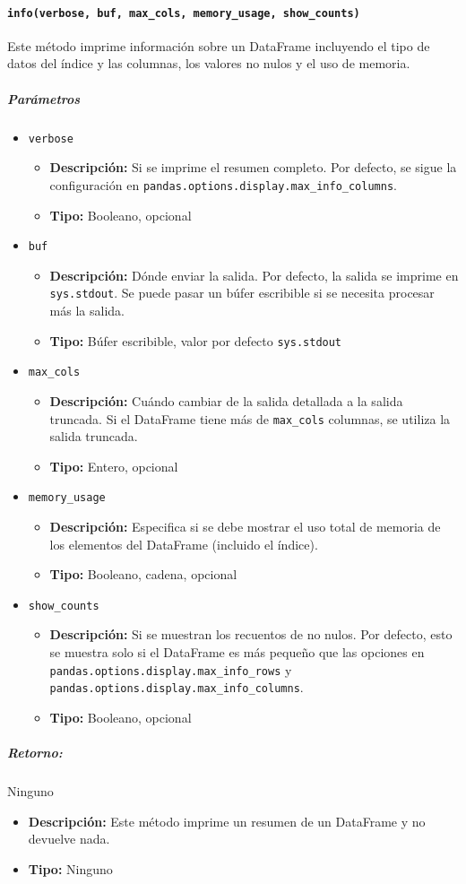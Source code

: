 \paragraph{\texttt{info(verbose, buf, max\_cols, memory\_usage, show\_counts)}} Este método imprime información sobre un DataFrame incluyendo el tipo de datos del índice y las columnas, los valores no nulos y el uso de memoria.
\subparagraph{\textbf{Parámetros}}
\begin{itemize}
\item \texttt{verbose}
\begin{itemize}
\item \textbf{Descripción:} Si se imprime el resumen completo. Por defecto, se sigue la configuración en \texttt{pandas.options.display.max\_info\_columns}.
\item \textbf{Tipo:} Booleano, opcional
\end{itemize}
\item \texttt{buf}
\begin{itemize}
\item \textbf{Descripción:} Dónde enviar la salida. Por defecto, la salida se imprime en \texttt{sys.stdout}. Se puede pasar un búfer escribible si se necesita procesar más la salida.
\item \textbf{Tipo:} Búfer escribible, valor por defecto \texttt{sys.stdout}
\end{itemize}
\item \texttt{max\_cols}
\begin{itemize}
\item \textbf{Descripción:} Cuándo cambiar de la salida detallada a la salida truncada. Si el DataFrame tiene más de \texttt{max\_cols} columnas, se utiliza la salida truncada. 
\item \textbf{Tipo:} Entero, opcional
\end{itemize}
\item \texttt{memory\_usage}
\begin{itemize}
\item \textbf{Descripción:} Especifica si se debe mostrar el uso total de memoria de los elementos del DataFrame (incluido el índice).
\item \textbf{Tipo:} Booleano, cadena, opcional
\end{itemize}
\item \texttt{show\_counts}
\begin{itemize}
\item \textbf{Descripción:} Si se muestran los recuentos de no nulos. Por defecto, esto se muestra solo si el DataFrame es más pequeño que las opciones en \texttt{pandas.options.display.max\_info\_rows} y \texttt{pandas.options.display.max\_info\_columns}.
\item \textbf{Tipo:} Booleano, opcional
\end{itemize}
\end{itemize}
\subparagraph{Retorno:} Ninguno
\begin{itemize}
\item \textbf{Descripción:} Este método imprime un resumen de un DataFrame y no devuelve nada.
\item \textbf{Tipo:} Ninguno
\end{itemize}
